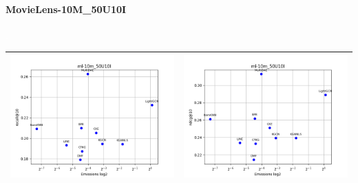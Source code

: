 \paragraph{MovieLens-10M\_50U10I} \textcolor{white}{.} \\
\begin{table}[H]
    \centering
    \footnotesize
    \setlength\tabcolsep{0pt}
    \begin{tabularx}{\textwidth}{|X|X|}
        \hline
        \includegraphics[width=\linewidth, trim=0 0 0 0]{images/recall@10_ml-10m_50U10I.png} &
        \includegraphics[width=\linewidth, trim=0 0 0 0]{images/ndcg@10_ml-10m_50U10I.png} \\
        \hline

\end{tabularx}
\end{table}
